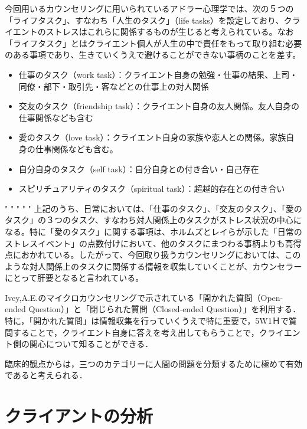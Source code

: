\documentclass[shuuron]{kuee}
\begin{document}
今回用いるカウンセリングに用いられているアドラー心理学では、次の５つの「ライフタスク」、すなわち「人生のタスク」（life tasks）を設定しており、クライエントのストレスはこれらに関係するものが生じると考えられている。なお「ライフタスク」とはクライエント個人が人生の中で責任をもって取り組む必要のある事項であり、生きていくうえで避けることができない事柄のことを差す。
\begin{itemize}
  \item 仕事のタスク（work task）：クライエント自身の勉強・仕事の結果、上司・同僚・部下・取引先・客などとの仕事上の対人関係
  \item 交友のタスク（friendship task）：クライエント自身の友人関係。友人自身の仕事関係なども含む
  \item 愛のタスク（love task）：クライエント自身の家族や恋人との関係。家族自身の仕事関係なども含む。
  \item 自分自身のタスク（self task）：自分自身との付き合い・自己存在
  \item スピリチュアリティのタスク（spiritual task）：超越的存在との付き合い\cite{大友秀治2013全人的人間理解を促進するスピリチュアリティ概念に関する一考察}
\end{itemize}
"
"
"
"
"
上記のうち、日常においては、「仕事のタスク」、「交友のタスク」、「愛のタスク」の３つのタスク、すなわち対人関係上のタスクがストレス状況の中心になる。特に「愛のタスク」に関する事項は、ホルムズとレイら\cite{holmes1967social}が示した「日常のストレスイベント」の点数付けにおいて、他のタスクにまつわる事柄よりも高得点におかれている。したがって、今回取り扱うカウンセリングにおいては、このような対人関係上のタスクに関係する情報を収集していくことが、カウンセラーにとって肝要となると言われている。



Ivey,A.E.\cite{ivey}のマイクロカウンセリングで示されている「開かれた質問（Open-ended Question）」と「閉じられた質問（Closed-ended Question）」を利用する．特に，「開かれた質問」は情報収集を行っていくうえで特に重要で，5W1Ｈで質問することで，クライエント自身に答えを考え出してもらうことで，クライエント側の関心について知ることができる．




臨床的観点からは，三つのカテゴリーに人間の問題を分類するために極めて有効であると考えられる．




\section{クライアントの分析}%
\end{document}

